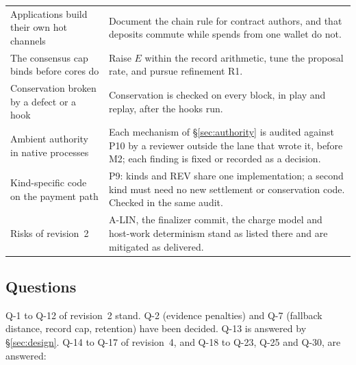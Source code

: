 \documentclass[11pt]{article}
\begin{document}
\begin{longtable}{@{}P{4.6cm}P{10.4cm}@{}}
Applications build their own hot channels & Document the chain rule for contract authors, and that deposits commute while spends from one wallet do not. \\
The consensus cap binds before cores do & Raise $E$ within the record arithmetic, tune the proposal rate, and pursue refinement R1. \\
Conservation broken by a defect or a hook & Conservation is checked on every block, in play and replay, after the hooks run. \\
Ambient authority in native processes & Each mechanism of \S\ref{sec:authority} is audited against P10 by a reviewer outside the lane that wrote it, before M2; each finding is fixed or recorded as a decision. \\
Kind-specific code on the payment path & P9: kinds and REV share one implementation; a second kind must need no new settlement or conservation code. Checked in the same audit. \\
Risks of revision~2 & A-LIN, the finalizer commit, the charge model and host-work determinism stand as listed there and are mitigated as delivered. \\
\bottomrule
\end{longtable}

\subsection{Questions}

Q-1 to Q-12 of revision~2 stand. Q-2 (evidence penalties) and Q-7 (fallback distance, record cap, retention) have been decided. Q-13 is answered by \S\ref{sec:design}. Q-14 to Q-17 of revision~4, and Q-18 to Q-23, Q-25 and Q-30, are answered:
\end{document}
